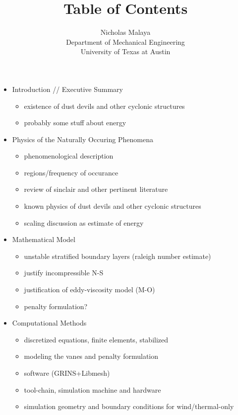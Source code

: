 \documentclass{article}
\title{\bf{Table of Contents}}
\author{Nicholas Malaya \\ Department of Mechanical Engineering \\ University of Texas at Austin} \date{}
\begin{document}
\maketitle

\begin{itemize}
 \item Introduction // Executive Summary
       \begin{itemize}
	\item existence of dust devils and other cyclonic structures
	\item probably some stuff about energy
       \end{itemize}

 \item Physics of the Naturally Occuring Phenomena
       \begin{itemize} 
	\item phenomenological description
	\item regions/frequency of occurance
	\item review of sinclair and other pertinent literature
        \item known physics of dust devils and other cyclonic structures
	\item scaling discussion as estimate of energy
       \end{itemize}

 \item Mathematical Model
       \begin{itemize}
	\item unstable stratified boundary layers (raleigh number estimate)
	\item justify incompressible N-S
	\item justification of eddy-viscosity model (M-O)
	\item penalty formulation?
       \end{itemize}

 \item Computational Methods
       \begin{itemize}
	\item discretized equations, finite elements, stabilized
	\item modeling the vanes and penalty formulation
	\item software (GRINS+Libmesh)
	\item tool-chain, simulation machine and hardware
	\item simulation geometry and boundary conditions for wind/thermal-only
       \end{itemize}


\end{itemize}
\end{document}
